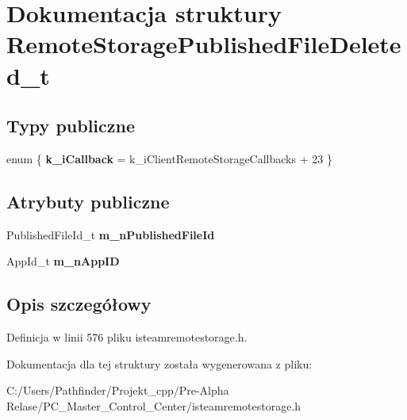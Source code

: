 \hypertarget{struct_remote_storage_published_file_deleted__t}{}\section{Dokumentacja struktury Remote\+Storage\+Published\+File\+Deleted\+\_\+t}
\label{struct_remote_storage_published_file_deleted__t}
\subsection*{Typy publiczne}
\begin{DoxyCompactItemize}
\item 
\mbox{\label{struct_remote_storage_published_file_deleted__t_aed8d9a57f1c55e951313f42ca44ffe5c}} 
enum \{ {\bfseries k\+\_\+i\+Callback} = k\+\_\+i\+Client\+Remote\+Storage\+Callbacks + 23
 \}
\end{DoxyCompactItemize}
\subsection*{Atrybuty publiczne}
\begin{DoxyCompactItemize}
\item 
\mbox{\label{struct_remote_storage_published_file_deleted__t_a442ac889c73b2fdec3c5c8d869a64f55}} 
Published\+File\+Id\+\_\+t {\bfseries m\+\_\+n\+Published\+File\+Id}
\item 
\mbox{\label{struct_remote_storage_published_file_deleted__t_ad6e7bbba612fd635fa5a60ebd7c45528}} 
App\+Id\+\_\+t {\bfseries m\+\_\+n\+App\+ID}
\end{DoxyCompactItemize}


\subsection{Opis szczegółowy}


Definicja w linii 576 pliku isteamremotestorage.\+h.



Dokumentacja dla tej struktury została wygenerowana z pliku\+:\begin{DoxyCompactItemize}
\item 
C\+:/\+Users/\+Pathfinder/\+Projekt\+\_\+cpp/\+Pre-\/\+Alpha Relase/\+P\+C\+\_\+\+Master\+\_\+\+Control\+\_\+\+Center/isteamremotestorage.\+h\end{DoxyCompactItemize}
